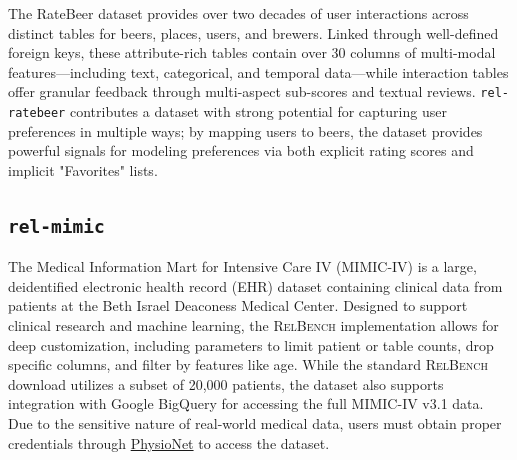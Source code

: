 \documentclass{article} %
\newcommand{\relbench}{\textsc{RelBench}\xspace}
\newcommand{\ratebeer}{\texttt{rel-ratebeer}\xspace}
\newcommand{\mimic}{\texttt{rel-mimic}\xspace}
\begin{document}
The RateBeer dataset provides over two decades of user interactions across distinct tables for beers, places, users, and brewers. Linked through well-defined foreign keys, these attribute-rich tables contain over 30 columns of multi-modal features—including text, categorical, and temporal data—while interaction tables offer granular feedback through multi-aspect sub-scores and textual reviews. \ratebeer contributes a dataset with strong potential for capturing user preferences in multiple ways; by mapping users to beers, the dataset provides powerful signals for modeling preferences via both explicit rating scores and implicit "Favorites" lists.



\subsection{\mimic}

The Medical Information Mart for Intensive Care IV (MIMIC-IV) \citep{johnson2024mimic} is a large, deidentified electronic health record (EHR) dataset containing clinical data from patients at the Beth Israel Deaconess Medical Center. Designed to support clinical research and machine learning, the \relbench implementation allows for deep customization, including parameters to limit patient or table counts, drop specific columns, and filter by features like age. While the standard \relbench download utilizes a subset of 20,000 patients, the dataset also supports integration with Google BigQuery for accessing the full MIMIC-IV v3.1 data. Due to the sensitive nature of real-world medical data, users must obtain proper credentials through \href{https://physionet.org/content/mimiciv/3.1/}{PhysioNet} to access the dataset.
\end{document}
